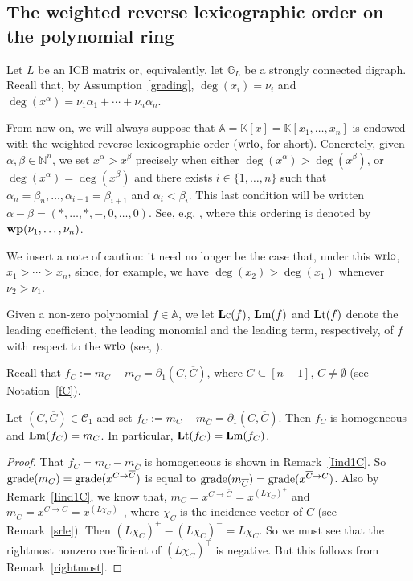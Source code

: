 \documentclass[ALCO]{cedram}
\newcommand{\mbn}{\mbox{$\mathbb{N}$}}
\newcommand{\mbk}{\mbox{$\mathbb{K}$}}
\newcommand{\mba}{\mbox{$\mathbb{A}$}}
\newcommand{\mbg}{\mbox{$\mathbb{G}$}}
\newcommand{\lc}{\mbox{${\bf L}{\rm c}$}}
\newcommand{\lm}{\mbox{${\bf L}{\rm m}$}}
\newcommand{\lt}{\mbox{${\bf L}{\rm t}$}}
\newcommand{\mcc}{\mbox{$\mathcal{C}$}}
\newcommand{\icb}{\mbox{$\mathrm{ICB}$}}
\newcommand{\dif}{\mbox{$\partial$}}
\newcommand{\grade}{\mbox{${\rm grade}$}}
\newcommand{\wrlo}{\mbox{${\rm wrlo}$}}
\begin{document}
\subsection{The weighted reverse lexicographic order on the polynomial 
ring}

 Let $L$ be an $\icb$ matrix or, equivalently, let $\mbg_L$
be a strongly connected digraph. Recall that, by
Assumption~\ref{grading}, $\deg(x_i)=\nu_i$ and
$\deg(x^\alpha)=\nu_1\alpha_1+\cdots +\nu_n\alpha_n$.

\begin{assumption}\label{wrlo}
From now on, we will always suppose that $\mba=\mbk[x]=\mbk[x_1,\ldots
  ,x_n]$ is endowed with the weighted reverse lexicographic order
($\wrlo$, for short). Concretely, given $\alpha,\beta\in\mbn^{n}$, we
set $x^\alpha>x^\beta$ precisely when either
$\deg(x^\alpha)>\deg(x^\beta)$, or $\deg(x^\alpha)=\deg(x^\beta)$ and
there exists $i\in\{1,\ldots ,n\}$ such that $\alpha_n=\beta_n,\ldots
,\alpha_{i+1}=\beta_{i+1}$ and $\alpha_i<\beta_i$. This last
condition will be written $\alpha-\beta=(*,\ldots,*,-,0,\ldots
,0)$. See, e.g, \cite[p.~13]{gp}, where this ordering is denoted by
${\bf wp}(\nu_1,\ldots ,\nu_n)$.
\end{assumption}

We insert a note of caution: it need no longer be the case that, under
this $\wrlo$, $x_1>\cdots >x_n$, since, for example, we have
$\deg(x_2)>\deg(x_1)$ whenever $\nu_2>\nu_1$.

Given a non-zero polynomial $f\in \mba$, we let $\lc(f)$, $\lm(f)$
and $\lt(f)$ denote the leading coefficient, the leading monomial
and the leading term, respectively, of $f$ with respect to the
$\wrlo$ (see, \eg \cite[\S~2.2,~Definition~7]{clo}).

Recall that $f_C:=m_C-m_{\overline{C}}=\dif_1(C,\overline{C})$, where
$C\subseteq [n-1]$, $C\neq\emptyset$ (see Notation~\ref{fC}).

\begin{lemma}\label{lm}
Let $(C,\overline{C})\in\mcc_1$ and set
$f_C:=m_C-m_{\overline{C}}=\dif_1(C,\overline{C})$. Then $f_C$ is
homogeneous and $\lm(f_C)=m_C$. In particular, $\lt(f_C)=\lm(f_C)$.
\end{lemma}
\begin{proof}
That $f_C=m_C-m_{\overline{C}}$ is homogeneous is shown in
Remark~\ref{Iind1C}. So $\grade(m_C)=\grade(x^{C\to\overline{C}})$ is
equal to $\grade(m_{\overline{C}})=\grade(x^{\overline{C}\to
  C})$. Also by Remark~\ref{Iind1C}, we know that,
$m_C=x^{C\to\overline{C}}=x^{(L\chi_C)^+}$ and
$m_{\overline{C}}=x^{\overline{C}\to C}=x^{(L\chi_C)^-}$, where
$\chi_C$ is the incidence vector of $C$ (see Remark~\ref{srle}). Then
$(L\chi_C)^+-(L\chi_C)^-=L\chi_C$. So we must see that the rightmost
nonzero coefficient of $(L\chi_C)^{\top}$ is negative. But this
follows from Remark~\ref{rightmost}.
\end{proof}
\end{document}
